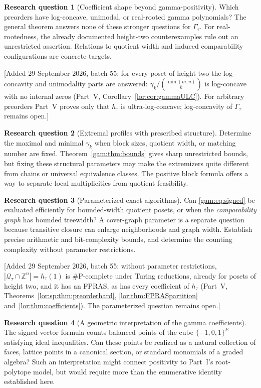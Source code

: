 \documentclass[11pt]{article}
\numberwithin{equation}{section}
\theoremstyle{definition}
\newtheorem{question}{Research question}%
\newcommand{\Z}{\mathbb Z}
\newcommand{\Qt}{\mathcal Q_\tau}
\begin{document}
\begin{question}[Coefficient shape beyond gamma-positivity]\label{lor:hq:shape}%
Which preorders have log-concave, unimodal, or real-rooted gamma polynomials?
The general theorem answers none of these stronger questions for
$\Gamma_\tau$. For real-rootedness, the already documented height-two
counterexamples rule out an unrestricted assertion. Relations to quotient
width and induced comparability configurations are concrete targets.
\end{question}
[Added 29 September 2026, batch 55: for every poset of height two the
log-concavity and unimodality parts are answered: $\gamma_k/\binom{\min(m,n)}k$
is log-concave with no internal zeros (Part~V,
Corollary~\ref{lor:cor:gammaULC}). For arbitrary preorders Part~V proves only
that $h_\tau$ is ultra-log-concave; log-concavity of $\Gamma_\tau$ remains
open.]

\begin{question}[Extremal profiles with prescribed structure]
Determine the maximal and minimal $\gamma_k$ when block sizes, quotient
width, or matching number are fixed. Theorem~\ref{gam:thm:bounds} gives sharp
unrestricted bounds, but fixing these structural parameters may make the
extremizers quite different from chains or universal equivalence classes.
The positive block formula offers a way to separate local multiplicities
from quotient feasibility.
\end{question}

\begin{question}[Parameterized exact algorithms]\label{lor:hq:param}%
Can \eqref{gam:eq:signed} be evaluated efficiently for bounded-width quotient
posets, or when the \emph{comparability graph} has bounded treewidth? A
cover-graph parameter is a separate question because transitive closure
can enlarge neighborhoods and graph width. Establish precise arithmetic
and bit-complexity bounds, and determine the counting complexity without
parameter restrictions.
\end{question}
[Added 29 September 2026, batch 55: without parameter restrictions,
$|\Qt\cap\Z^n|=h_\tau(1)$ is $\#\mathrm P$-complete under Turing reductions,
already for posets of height two, and it has an FPRAS, as has every
coefficient of $h_\tau$ (Part~V, Theorems~\ref{lor:sp:thm:preorderhard},
\ref{lor:thm:FPRASpartition} and~\ref{lor:thm:coefficients}). The
parameterized question remains open.]

\begin{question}[A geometric interpretation of the gamma coefficients]
The signed-vector formula counts balanced points of the cube
$\{-1,0,1\}^E$ satisfying ideal inequalities. Can these points be realized
as a natural collection of faces, lattice points in a canonical section,
or standard monomials of a graded algebra? Such an interpretation might
connect positivity to Part~I's root-polytope model, but would
require more than the enumerative identity established here.
\end{question}
\end{document}
